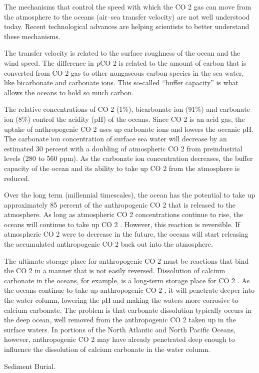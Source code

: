 \documentclass[
]{book}
\begin{document}
The mechanisms that control the speed with which the CO 2 gas can move from the atmosphere to the oceans (air--sea transfer velocity) are not well understood today. Recent technological advances are helping scientists to better understand these mechanisms.

The transfer velocity is related to the surface roughness of the ocean and the wind speed. The difference in pCO 2 is related to the amount of carbon that is converted from CO 2 gas to other nongaseous carbon species in the sea water, like bicarbonate and carbonate ions. This so-called ``buffer capacity'' is what allows the oceans to hold so much carbon.

The relative concentrations of CO 2 (1\%), bicarbonate ion (91\%) and carbonate ion (8\%) control the acidity (pH) of the oceans. Since CO 2 is an acid gas, the uptake of anthropogenic CO 2 uses up carbonate ions and lowers the oceanic pH. The carbonate ion concentration of surface sea water will decrease by an estimated 30 percent with a doubling of atmospheric CO 2 from preindustrial levels (280 to 560 ppm). As the carbonate ion concentration decreases, the buffer capacity of the ocean and its ability to take up CO 2 from the atmosphere is reduced.

Over the long term (millennial timescales), the ocean has the potential to take up approximately 85 percent of the anthropogenic CO 2 that is released to the atmosphere. As long as atmospheric CO 2 concentrations continue to rise, the oceans will continue to take up CO 2 . However, this reaction is reversible. If atmospheric CO 2 were to decrease in the future, the oceans will start releasing the accumulated anthropogenic CO 2 back out into the atmosphere.

The ultimate storage place for anthropogenic CO 2 must be reactions that bind the CO 2 in a manner that is not easily reversed. Dissolution of calcium carbonate in the oceans, for example, is a long-term storage place for CO 2 . As the oceans continue to take up anthropogenic CO 2 , it will penetrate deeper into the water column, lowering the pH and making the waters more corrosive to calcium carbonate. The problem is that carbonate dissolution typically occurs in the deep ocean, well removed from the anthropogenic CO 2 taken up in the surface waters. In portions of the North Atlantic and North Pacific Oceans, however, anthropogenic CO 2 may have already penetrated deep enough to influence the dissolution of calcium carbonate in the water column.

Sediment Burial.
\end{document}
